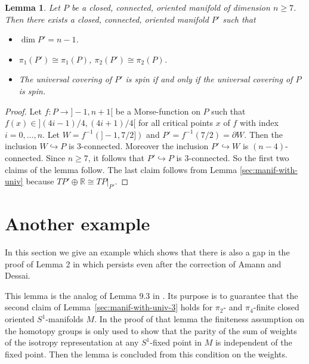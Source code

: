 \documentclass[a4paper, 11pt]{amsart}
\newtheorem{lemma}[theorem]{Lemma}
\theoremstyle{definition}
\theoremstyle{remark}
\numberwithin{equation}{section}
\begin{document}
\begin{lemma}
  \label{sec:equivariant-surgery-2}
  Let \(P\) be a closed, connected, oriented manifold of dimension \(n\geq 7\). Then there exists a closed, connected, oriented manifold \(P'\) such that
  \begin{itemize}
  \item \(\dim P'=n-1\).
  \item \(\pi_1(P')\cong \pi_1(P)\), \(\pi_2(P')\cong \pi_2(P)\).
  \item The universal covering of \(P'\) is spin if and only if the universal covering of \(P\) is spin.
  \end{itemize}
\end{lemma}
\begin{proof}
  Let \(f:P\rightarrow ]-1,n+1[\) be a Morse-function on \(P\) such that \(f(x)\in ](4i-1)/4,(4i+1)/4[\) for all critical points \(x\) of \(f\) with index \(i=0,\dots,n\).
  Let \(W=f^{-1}(]-1,7/2])\) and \(P'=f^{-1}(7/2)=\partial W\).
  Then the inclusion \(W\hookrightarrow P\) is \(3\)-connected.
  Moreover the inclusion \(P'\hookrightarrow W\) is \((n-4)\)-connected.
  Since \(n\geq 7\), it follows that \(P'\hookrightarrow P\) is \(3\)-connected.
  So the first two claims of the lemma follow.
  The last claim follows from Lemma \ref{sec:manif-with-univ} because \(TP'\oplus \mathbb{R}\cong TP|_{P'}\).
\end{proof}







\section{Another example}
\label{sec:another-example}

In this section we give an example which shows that there is also a gap in the proof of Lemma 2 in \cite{MR1979364} which persists even after the correction of Amann and Dessai.

This lemma is the analog of Lemma 9.3 in \cite{MR954493}.
Its purpose is to guarantee that the second claim of Lemma~\ref{sec:manif-with-univ-3} holds for \(\pi_2\)- and \(\pi_4\)-finite closed oriented \(S^1\)-manifolds \(M\).
In the proof of that lemma the finiteness assumption on the homotopy groups is only used to show that the parity of the sum of weights of the isotropy representation at any \(S^1\)-fixed point in \(M\) is independent of the fixed point.
Then the lemma is concluded from this condition on the weights.
\end{document}
